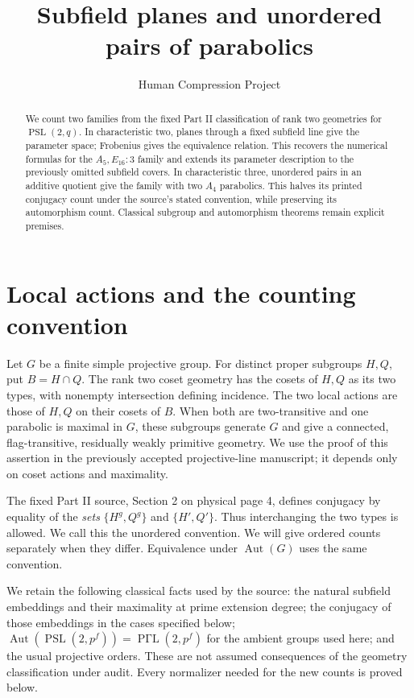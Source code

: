 \documentclass[11pt]{article}
\title{Subfield planes and unordered pairs of parabolics}
\author{Human Compression Project}
\date{}
\newcommand{\PSL}{\operatorname{PSL}}
\newcommand{\Aut}{\operatorname{Aut}}
\begin{document}
\maketitle
\begin{abstract}
We count two families from the fixed Part II classification of rank two
geometries for $\PSL(2,q)$. In characteristic two, planes through a fixed
subfield line give the parameter space; Frobenius gives the equivalence
relation. This recovers the numerical formulas for the $A_5,E_{16}:3$
family and extends its parameter description to the previously omitted
subfield covers. In characteristic three, unordered pairs in an additive
quotient give the family with two $A_4$ parabolics. This halves its printed
conjugacy count under the source's stated convention, while preserving its
automorphism count. Classical subgroup and automorphism theorems remain
explicit premises.
\end{abstract}

\section{Local actions and the counting convention}
Let $G$ be a finite simple projective group. For distinct proper subgroups
$H,Q$, put $B=H\cap Q$. The rank two coset geometry has the cosets of
$H,Q$ as its two types, with nonempty intersection defining incidence.
The two local actions are those of $H,Q$ on their cosets of $B$.
When both are two-transitive and one parabolic is maximal in $G$, these
subgroups generate $G$ and give a connected, flag-transitive, residually
weakly primitive geometry. We use the proof of this assertion in the
previously accepted projective-line manuscript; it depends only on coset
actions and maximality.

The fixed Part II source, Section 2 on physical page 4, defines conjugacy
by equality of the \emph{sets} $\{H^g,Q^g\}$ and $\{H',Q'\}$.
Thus interchanging the two types is allowed. We call this the unordered
convention. We will give ordered counts separately when they differ.
Equivalence under $\Aut(G)$ uses the same convention.

We retain the following classical facts used by the source: the natural
subfield embeddings and their maximality at prime extension degree;
the conjugacy of those embeddings in the cases specified below;
$\Aut(\PSL(2,p^f))=\operatorname{P\Gamma L}(2,p^f)$ for the ambient
groups used here; and the usual projective orders. These are not assumed
consequences of the geometry classification under audit. Every normalizer
needed for the new counts is proved below.
\end{document}
